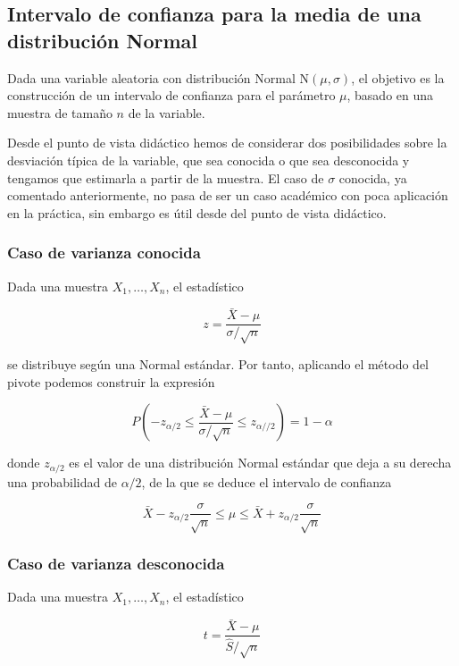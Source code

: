 \documentclass[
]{article}
\begin{document}
\subsection{Intervalo de confianza para la media de una distribución Normal}\label{intervalo-de-confianza-para-la-media-de-una-distribuciuxf3n-normal}

Dada una variable aleatoria con distribución Normal \(\mathrm{N}(\mu, \sigma)\), el objetivo es la construcción de un intervalo de confianza para el parámetro \(\mu\), basado en una muestra de tamaño \(n\) de la variable.

Desde el punto de vista didáctico hemos de considerar dos posibilidades sobre la desviación típica de la variable, que sea conocida o que sea desconocida y tengamos que estimarla a partir de la muestra. El caso de \(\sigma\) conocida, ya comentado anteriormente, no pasa de ser un caso académico con poca aplicación en la práctica, sin embargo es útil desde del punto de vista didáctico.

\subsubsection{Caso de varianza conocida}\label{caso-de-varianza-conocida}

Dada una muestra \(X_{1}, \ldots, X_{n}\), el estadístico

\[
z=\frac{\bar{X}-\mu}{\sigma / \sqrt{n}}
\]

se distribuye según una Normal estándar. Por tanto, aplicando el método del pivote podemos construir la expresión

\[
P\left(-z_{\alpha/ 2} \leq \frac{\bar{X}-\mu}{\sigma / \sqrt{n}} \leq z_{\alpha / / 2}\right)=1-\alpha
\]

donde \(z_{\alpha / 2}\) es el valor de una distribución Normal estándar que deja a su derecha una probabilidad de \(\alpha / 2\), de la que se deduce el intervalo de confianza

\[
\bar{X}-z_{\alpha / 2} \frac{\sigma}{\sqrt{n}} \leq \mu \leq \bar{X}+z_{\alpha / 2} \frac{\sigma}{\sqrt{n}}
\]

\subsubsection{Caso de varianza desconocida}\label{caso-de-varianza-desconocida}

Dada una muestra \(X_{1}, \ldots, X_{n}\), el estadístico

\[
t=\frac{\bar{X}-\mu}{\hat{S} / \sqrt{n}}
\]
\end{document}
